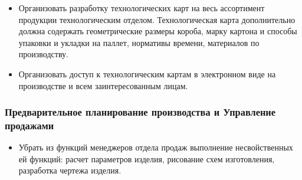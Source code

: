  \begin{itemize}
 \item Организовать разработку технологических карт на весь ассортимент продукции технологическим отделом. Технологическая карта дополнительно должна содержать геометрические размеры короба, марку картона и способы упаковки и укладки на паллет, нормативы времени, материалов по производству.
 \item Организовать доступ к технологическим картам в электронном виде на производстве и всем заинтересованным лицам.
 \end{itemize}

\subsubsection{Предварительное планирование производства и Управление продажами}
\begin{itemize}
\item Убрать из функций менеджеров отдела продаж выполнение несвойственных ей функций: расчет параметров изделия, рисование схем изготовления, разработка чертежа изделия.
\end{itemize}


